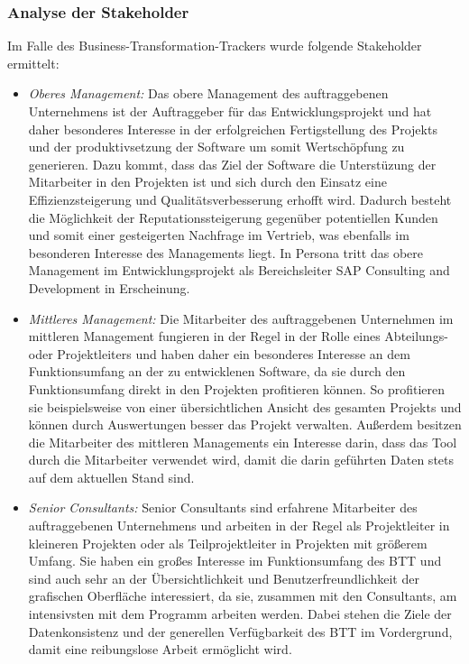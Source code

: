 \subsubsection{Analyse der Stakeholder}
Im Falle des Business-Transformation-Trackers wurde folgende Stakeholder ermittelt:
\begin{itemize}
    \item[] \emph{Oberes Management:} Das obere Management des auftraggebenen Unternehmens ist der Auftraggeber für das Entwicklungsprojekt und hat daher besonderes Interesse in der erfolgreichen Fertigstellung des Projekts und der produktivsetzung der Software um somit Wertschöpfung zu generieren. Dazu kommt, dass das Ziel der Software die Unterstüzung der Mitarbeiter in den Projekten ist und sich durch den Einsatz eine Effizienzsteigerung und Qualitätsverbesserung erhofft wird. Dadurch besteht die Möglichkeit der Reputationssteigerung gegenüber potentiellen Kunden und somit einer gesteigerten Nachfrage im Vertrieb, was ebenfalls im besonderen Interesse des Managements liegt. In Persona tritt das obere Management im Entwicklungsprojekt als Bereichsleiter \glqq{}SAP Consulting and Development\grqq{} in Erscheinung.
    \item[] \emph{Mittleres Management:} Die Mitarbeiter des auftraggebenen Unternehmen im mittleren Management fungieren in der Regel in der Rolle eines Abteilungs- oder Projektleiters und haben daher ein besonderes Interesse an dem Funktionsumfang an der zu entwicklenen Software, da sie durch den Funktionsumfang direkt in den Projekten profitieren können. So profitieren sie beispielsweise von einer übersichtlichen Ansicht des gesamten Projekts und können durch Auswertungen besser das Projekt verwalten. Außerdem besitzen die Mitarbeiter des mittleren Managements ein Interesse darin, dass das Tool durch die Mitarbeiter verwendet wird, damit die darin geführten Daten stets auf dem aktuellen Stand sind. 
    \item[] \emph{Senior Consultants:} Senior Consultants sind erfahrene Mitarbeiter des auftraggebenen Unternehmens und arbeiten in der Regel als Projektleiter in kleineren Projekten oder als Teilprojektleiter in Projekten mit größerem Umfang. Sie haben ein großes Interesse im Funktionsumfang des BTT und sind auch sehr an der Übersichtlichkeit und Benutzerfreundlichkeit der grafischen Oberfläche interessiert, da sie, zusammen mit den Consultants, am intensivsten mit dem Programm arbeiten werden. Dabei stehen die Ziele der Datenkonsistenz und der generellen Verfügbarkeit des BTT im Vordergrund, damit eine reibungslose Arbeit ermöglicht wird.

\end{itemize}
